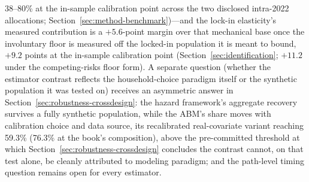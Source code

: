 \documentclass[12pt]{article}
\begin{document}
38--80\% at the in-sample calibration point across the two disclosed intra-2022 allocations; Section~\ref{sec:method-benchmark})---and the lock-in elasticity's measured contribution is a $+5.6$-point margin over that mechanical base once the involuntary floor is measured off the locked-in population it is meant to bound, $+9.2$ points at the in-sample calibration point (Section~\ref{sec:identification}; $+11.2$ under the competing-risks floor form). A separate question (whether the estimator contrast reflects the household-choice paradigm itself or the synthetic population it was tested on) receives an asymmetric answer in Section~\ref{sec:robustness-crossdesign}: the hazard framework's aggregate recovery survives a fully synthetic population, while the ABM's share moves with calibration choice and data source, its recalibrated real-covariate variant reaching 59.3\% (76.3\% at the book's composition), above the pre-committed threshold at which Section~\ref{sec:robustness-crossdesign} concludes the contrast cannot, on that test alone, be cleanly attributed to modeling paradigm; and the path-level timing question remains open for every estimator.
\end{document}
